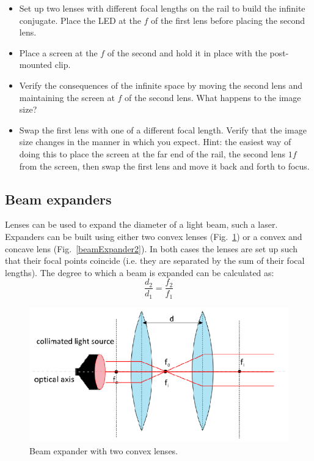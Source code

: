 \documentclass[a4paper]{report}
\begin{document}
\begin{itemize}
\item Set up two lenses with different focal lengths on the rail to build the infinite conjugate. 
Place the LED at the $f$ of the first lens before placing the second lens. 
\item Place a screen at the $f$ of the second and hold it in place with the post-mounted clip.
\item Verify the consequences of the infinite space by moving the second lens and maintaining the screen at $f$ of the second lens. 
What happens to the image size?
\item Swap the first lens with one of a different focal length. 
Verify that the image size changes in the manner in which you expect.
Hint: the easiest way of doing this to place the screen at the far end of the rail, the second lens $1f$ from the screen, then swap the first lens and move it back and forth to focus. 
\end{itemize}

\clearpage
\subsection{Beam expanders}
Lenses can be used to expand the diameter of a light beam, such a laser.
Expanders can be built using either two convex lenses (Fig.~\ref{beamExpander1}) or a convex and concave lens (Fig.~\ref{beamExpander2}). 
In both cases the lenses are set up such that their focal points coincide (i.e. they are separated by the sum of their focal lengths). 
The degree to which a beam is expanded can be calculated as:
\begin{equation}
\frac{d_2}{d_1}=\frac{f_2}{f_1}
\label{eq:beamExp}
\end{equation}

\begin{figure}[h]
\center
\includegraphics[width=4.5in]{beamExpander1.eps}
\caption{Beam expander with two convex lenses.}
\label{beamExpander1}
\end{figure}
\end{document}
